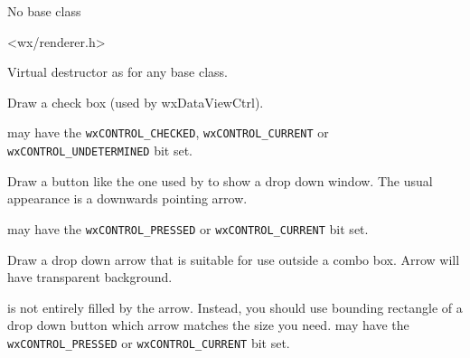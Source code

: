 
No base class


<wx/renderer.h>






\label{wxrenderernativedtor}


Virtual destructor as for any base class.


\label{wxrenderernativedrawcheckbox}


Draw a check box (used by wxDataViewCtrl).

 may have the \texttt{wxCONTROL\_CHECKED}, \texttt{wxCONTROL\_CURRENT} or
\texttt{wxCONTROL\_UNDETERMINED} bit set.


\label{wxrenderernativedrawcomboboxdropbutton}


Draw a button like the one used by  to show a
drop down window. The usual appearance is a downwards pointing arrow.

 may have the \texttt{wxCONTROL\_PRESSED} or \texttt{wxCONTROL\_CURRENT} bit set.


\label{wxrenderernativedrawdroparrow}


Draw a drop down arrow that is suitable for use outside a combo box. Arrow will have
transparent background.

 is not entirely filled by the arrow. Instead, you should use bounding
rectangle of a drop down button which arrow matches the size you need.
 may have the \texttt{wxCONTROL\_PRESSED} or \texttt{wxCONTROL\_CURRENT} bit set.


